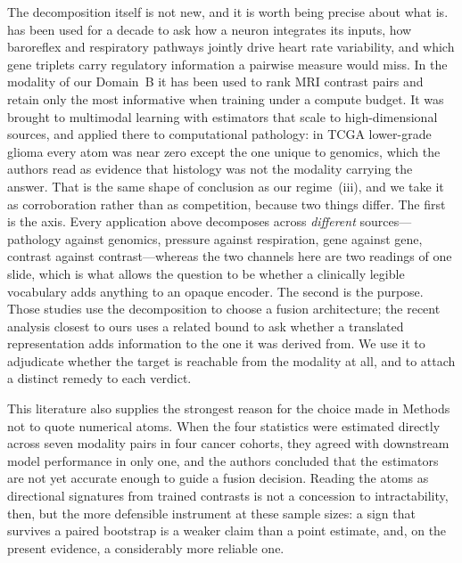 The decomposition itself is not new, and it is worth being precise
about what is.
 has been used for a decade to ask how a neuron integrates
its inputs, how baroreflex and respiratory pathways jointly drive heart
rate variability,\cite{krohova2019hrv} and which gene triplets carry
regulatory information a pairwise measure would
miss.\cite{chan2017pidc}
In the modality of our Domain~B it has been used to rank MRI contrast
pairs and retain only the most informative when training under a compute
budget.\cite{chopra2026pidmri}
It was brought to multimodal learning with estimators that scale to
high-dimensional sources, and applied there to computational pathology:
in TCGA lower-grade glioma every atom was near zero except the one
unique to genomics, which the authors read as evidence that histology
was not the modality carrying the answer.\cite{liang2023quantifying}
That is the same shape of conclusion as our regime~(iii), and we take it
as corroboration rather than as competition, because two things differ.
The first is the axis. Every application above decomposes across
\emph{different} sources---pathology against genomics, pressure against
respiration, gene against gene, contrast against
contrast---whereas the two channels here are two
readings of one slide, which is what allows the question to be whether a
clinically legible vocabulary adds anything to an opaque encoder.
The second is the purpose. Those studies use the decomposition to choose
a fusion architecture; the recent analysis closest to ours uses a
related bound to ask whether a translated representation adds
information to the one it was derived from.\cite{saisan2026ceilings}
We use it to adjudicate whether the target is reachable from the
modality at all, and to attach a distinct remedy to each verdict.

This literature also supplies the strongest reason for the choice made
in Methods not to quote numerical atoms. When the four \pid{} statistics
were estimated directly across seven modality pairs in four cancer
cohorts, they agreed with downstream model performance in only one, and
the authors concluded that the estimators are not yet accurate enough to
guide a fusion decision.\cite{zhang2025evaluatingpid}
Reading the atoms as directional signatures from trained contrasts is
not a concession to intractability, then, but the more defensible
instrument at these sample sizes: a sign that survives a paired
bootstrap is a weaker claim than a point estimate, and, on the present
evidence, a considerably more reliable one.

